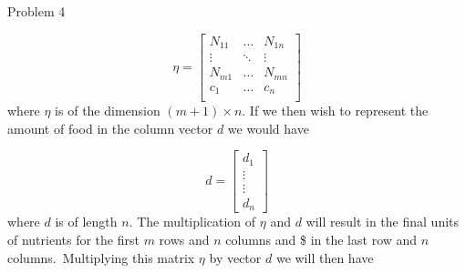 \begin{problem}{Problem 4}
\begin{Highlight}[Solution]
        \setcounter{equation}{0}
        \begin{equation}
            \eta = 
            \begin{bmatrix}
                N_{11} & \dots & N_{1n} \\
                \vdots & \ddots & \vdots \\
                N_{m1} & \dots & N_{mn} \\
                c_{1} & \dots & c_{n} \\
            \end{bmatrix}
        \end{equation}
        where $\eta$ is of the dimension $(m + 1) \times n$. If we then wish to represent the amount of food in the column vector $d$ we would have

        \begin{equation}
            d =
            \begin{bmatrix}
                d_{1} \\
                \vdots \\
                \vdots \\
                d_{n}
            \end{bmatrix}
        \end{equation}
        where $d$ is of length $n$. The multiplication of $\eta$ and $d$ will result in the final units of nutrients for the first $m$ rows and $n$ columns and \$ in the last row and $n$ columns.\
        Multiplying this matrix $\eta$ by vector $d$ we will then have


\end{Highlight}
\end{problem}
